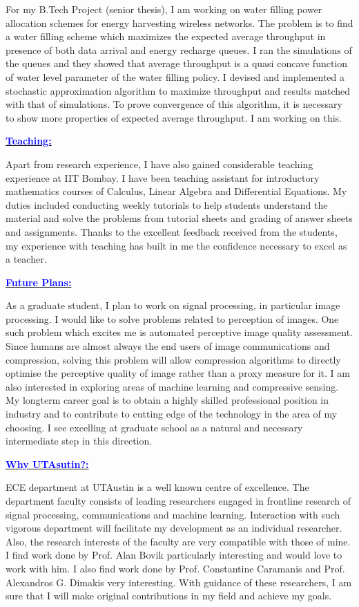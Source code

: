 \documentclass[11pt]{article}
\newcommand{\statement}[1]{\par\medskip
  \underline{\textcolor{blue}{\textbf{#1:}}}\space
}
\begin{document}
For my B.Tech Project (senior thesis), I am working on water filling power allocation schemes for energy harvesting wireless networks. 
The problem is to find a water filling scheme which maximizes the expected average throughput in presence of both data arrival and energy recharge queues. 
I ran the simulations of the queues and they showed that average throughput is a quasi concave function of water level parameter of the water filling policy. 
I devised and implemented a stochastic approximation algorithm to maximize throughput and results matched with that of simulations. 
To prove convergence of this algorithm, it is necessary to show more properties of expected average throughput. I am working on this.

\statement{Teaching}
Apart from research experience, I have also gained considerable teaching experience at IIT Bombay. 
I have been teaching assistant for introductory mathematics courses of Calculus, Linear Algebra and Differential Equations. 
My duties included conducting weekly tutorials to help students understand the material and solve the problems from tutorial sheets and grading of answer sheets and assignments.
Thanks to the excellent feedback received from the students, my experience with teaching has built in me the confidence necessary to excel as a teacher.

\statement{Future Plans}
As a graduate student, I plan to work on signal processing, in particular image processing. 
I would like to solve problems related to perception of images. One such problem which excites me is automated perceptive image quality assessment.
Since humans are almost always the end users of image communications and compression, solving this problem will allow compression algorithms to directly optimise the perceptive quality of image rather than a proxy measure for it. 
I am also interested in exploring areas of machine learning and compressive sensing. 
My longterm career goal is to obtain a highly skilled professional position in industry and to contribute to cutting edge of the technology in the area of my choosing. 
I see excelling at graduate school as a natural and necessary intermediate step in this direction.

\statement{Why UTAsutin?}
ECE department at UTAustin is a well known centre of excellence. The department faculty consists of leading researchers engaged in frontline research of signal processing, communications and machine learning.
Interaction with such vigorous department will facilitate my development as an individual researcher.
Also, the research interests of the faculty are very compatible with those of mine. 
I find work done by Prof. Alan Bovik particularly interesting and would love to work with him. 
I also find work done by Prof. Constantine Caramanis and Prof. Alexandros G. Dimakis very interesting.
With guidance of these researchers, I am sure that I will make original contributions in my field and achieve my goals.
\end{document}
